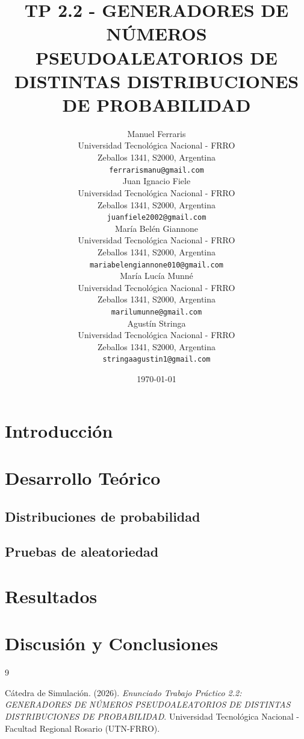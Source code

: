 \documentclass{article}
\title{TP 2.2 - GENERADORES DE NÚMEROS PSEUDOALEATORIOS DE DISTINTAS DISTRIBUCIONES DE PROBABILIDAD}
\author{
  Manuel Ferraris \\
  Universidad Tecnológica Nacional - FRRO \\
  Zeballos 1341, S2000, Argentina \\
  \texttt{ferrarismanu@gmail.com} \\
  \And
  Juan Ignacio Fiele \\
  Universidad Tecnológica Nacional - FRRO \\
  Zeballos 1341, S2000, Argentina \\
  \texttt{juanfiele2002@gmail.com} \\
  \And
  María Belén Giannone \\
  Universidad Tecnológica Nacional - FRRO \\
  Zeballos 1341, S2000, Argentina \\
  \texttt{mariabelengiannone010@gmail.com} \\
  \And
  María Lucía Munné \\
  Universidad Tecnológica Nacional - FRRO \\
  Zeballos 1341, S2000, Argentina \\
  \texttt{marilumunne@gmail.com} \\
  \And
  Agustín Stringa \\
  Universidad Tecnológica Nacional - FRRO \\
  Zeballos 1341, S2000, Argentina \\
  \texttt{stringaagustin1@gmail.com} \\
}
\date{\today}
\begin{document}
\maketitle


\begin{abstract}
\end{abstract}

\section{Introducción}

\section{Desarrollo Teórico}

\subsection{Distribuciones de probabilidad}


\subsection{Pruebas de aleatoriedad}

\section{Resultados}


\section{Discusión y Conclusiones}

\begin{thebibliography}{9}

  Cátedra de Simulación. (2026). \textit{Enunciado Trabajo Práctico 2.2: GENERADORES DE NÚMEROS PSEUDOALEATORIOS DE DISTINTAS DISTRIBUCIONES DE PROBABILIDAD}. Universidad Tecnológica Nacional - Facultad Regional Rosario (UTN-FRRO).

\end{thebibliography}
\end{document}
